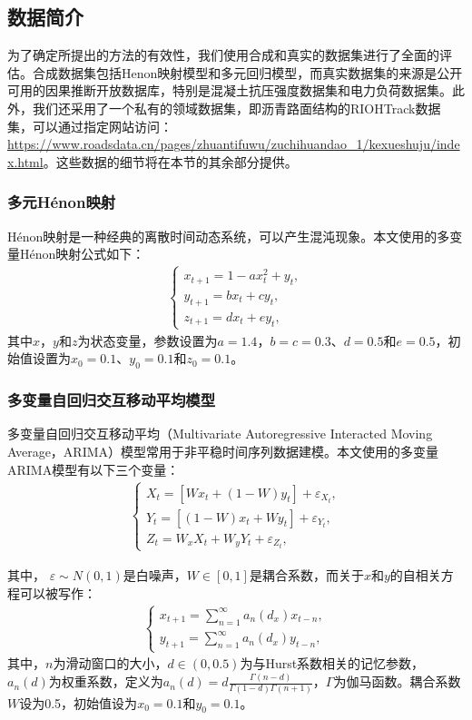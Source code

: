 \subsection{数据简介}
为了确定所提出的方法的有效性，我们使用合成和真实的数据集进行了全面的评估。合成数据集包括Henon映射模型和多元回归模型，而真实数据集的来源是公开可用的因果推断开放数据库，特别是混凝土抗压强度数据集和电力负荷数据集。此外，我们还采用了一个私有的领域数据集，即沥青路面结构的RIOHTrack数据集，可以通过指定网站访问： \url{https://www.roadsdata.cn/pages/zhuantifuwu/zuchihuandao_1/kexueshuju/index.html}。这些数据的细节将在本节的其余部分提供。

\subsubsection{多元H\'{e}non映射}
H\'{e}non映射是一种经典的离散时间动态系统，可以产生混沌现象。本文使用的多变量H\'{e}non映射公式如下：
\begin{align*}
\begin{cases}
x_{t+1}=1 - ax^{2}_{t} + y_{t},\\[0.5em]
y_{t+1}=bx_{t}+cy_{t},\\[0.5em]
z_{t+1}=dx_{t}+ey_{t},
\end{cases}
\end{align*}
其中$x$，$y$和$z$为状态变量，参数设置为$a=1.4$，$b=c=0.3$、$d=0.5$和$e=0.5$，初始值设置为$x_{0}=0.1$、$y_{0}=0.1$和$z_{0}=0.1$。

\subsubsection{多变量自回归交互移动平均模型}
多变量自回归交互移动平均（Multivariate Autoregressive Interacted Moving Average，ARIMA）模型常用于非平稳时间序列数据建模。本文使用的多变量ARIMA模型有以下三个变量：
\begin{align*}
\begin{cases}
X_{t}= [Wx_{t}+(1-W)y_{t}]+\varepsilon_{X_{t}},\\[0.5em]
Y_{t}= [(1-W)x_{t}+Wy_{t}]+\varepsilon_{Y_{t}},\\[0.5em]
Z_{t}= W_{x}X_{t}+W_{y}Y_{t}+\varepsilon_{Z_{t}},
\end{cases}
\end{align*}

其中， $\varepsilon\sim N(0,1)$是白噪声，$W\in [0,1]$是耦合系数，而关于$x$和$y$的自相关方程可以被写作：
\begin{align}\label{mVAR_var}
\begin{cases}
x_{t+1} =\sum\limits_{n=1}^{\infty}a_{n}(d_{x})x_{t-n},\\[0.5em]
y_{t+1} =\sum\limits_{n=1}^{\infty}a_{n}(d_{x})y_{t-n},
\end{cases}
\end{align}
其中，$n$为滑动窗口的大小，$d\in(0,0.5)$为与Hurst系数相关的记忆参数，$a_{n}(d)$为权重系数，定义为$a_{n}(d)=d\frac{\Gamma(n-d)}{\Gamma(1-d)\Gamma(n+1)}$，$\Gamma$为伽马函数。耦合系数$W$设为0.5，初始值设为$x_{0}=0.1$和$y_{0}=0.1$。

